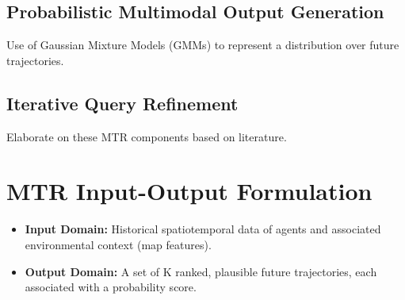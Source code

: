     \subsection{Probabilistic Multimodal Output Generation}
    Use of Gaussian Mixture Models (GMMs) to represent a distribution over future trajectories.
    \subsection{Iterative Query Refinement}
    Elaborate on these MTR components based on literature.

\section{MTR Input-Output Formulation}
\label{sec:model_mtr_io}
    \begin{itemize}
        \item \textbf{Input Domain:} Historical spatiotemporal data of agents and associated environmental context (map features).
        \item \textbf{Output Domain:} A set of K ranked, plausible future trajectories, each associated with a probability score.
    \end{itemize}